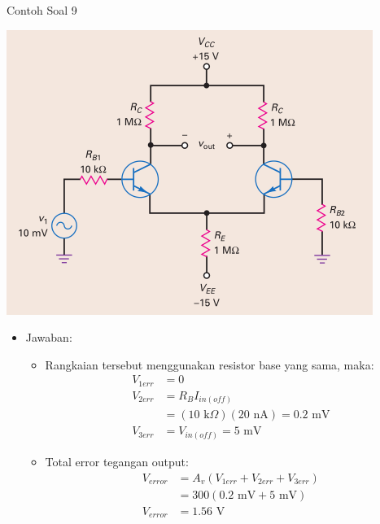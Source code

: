 \documentclass[aspectratio=169]{beamer}
\begin{document}
\begin{frame}{Contoh Soal 9}
	\begin{multicols}{2}
		\begin{center}
			\includegraphics[height=0.7\textheight]{gambar/01.contoh_soal_9}
		\end{center}
		\columnbreak
		\begin{itemize}
			\item Jawaban:
			\begin{itemize}
				\item Rangkaian tersebut menggunakan resistor base yang sama, maka:
				\begin{align*}
					V_{1err} &= 0 \\
					V_{2err} &= R_{B}I_{in(off)} \\
					&= (10 \text{ k}\Omega)(20 \text{ nA}) = 0.2 \text{ mV} \\
					V_{3err} &= V_{in(off)} = 5 \text{ mV}
				\end{align*}
			\item Total error tegangan output:
			\begin{align*}
				V_{error} &= A_v (V_{1err} + V_{2err} + V_{3err}) \\
				&= 300 (0.2 \text{ mV} + 5 \text{ mV}) \\
				V_{error} &= 1.56 \text{ V}
			\end{align*}
			\end{itemize}
		\end{itemize}
	\end{multicols}
\end{frame}
\end{document}
